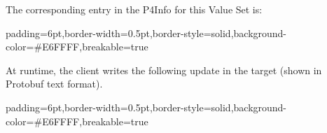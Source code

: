 \documentclass[11pt]{article}
\begin{document}
{%
\noindent{}The corresponding entry in the P4Info for this Value Set is:%

\begin{mdbmargintb}{6pt}{6pt}%
\begin{mdblock}{padding=6pt,border-width=0.5pt,border-style=solid,background-color=\#E6FFFF,breakable=true}%
\begin{mdpre}%
\end{mdpre}%
\end{mdblock}%
\end{mdbmargintb}%

\noindent{}At runtime, the client writes the following update in the target (shown in
Protobuf text format).%

\begin{mdbmargintb}{6pt}{6pt}%
\begin{mdblock}{padding=6pt,border-width=0.5pt,border-style=solid,background-color=\#E6FFFF,breakable=true}%
\begin{mdpre}%
\end{mdpre}%
\end{mdblock}%
\end{mdbmargintb}%

}
\end{document}
